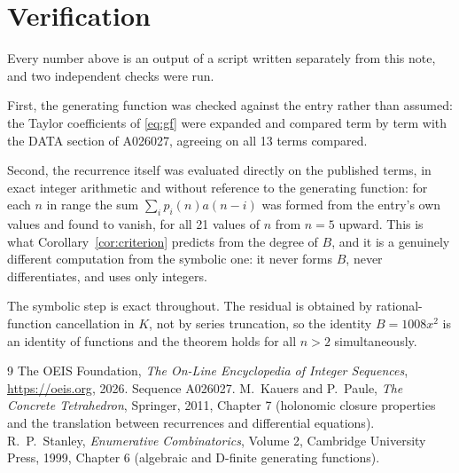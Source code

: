 \documentclass[11pt,a4paper]{article}
\theoremstyle{plain}
\theoremstyle{definition}
\begin{document}
\section{Verification}

Every number above is an output of a script written separately from this note, and two
independent checks were run.

First, the generating function was checked against the entry rather than assumed: the
Taylor coefficients of \eqref{eq:gf} were expanded and compared term by term with the DATA
section of A026027, agreeing on all 13 terms compared.

Second, the recurrence itself was evaluated directly on the published terms, in exact
integer arithmetic and without reference to the generating function: for each $n$ in range
the sum $\sum_{i}p_{i}(n)a(n-i)$ was formed from the entry's own values and found to
vanish, for all 21 values of $n$ from $n=5$ upward. This is what
Corollary~\ref{cor:criterion} predicts from the degree of $B$, and it is a genuinely
different computation from the symbolic one: it never forms $B$, never differentiates, and
uses only integers.

The symbolic step is exact throughout. The residual is obtained by rational-function
cancellation in $K$, not by series truncation, so the identity $B=1008 x^{2}$ is an
identity of functions and the theorem holds for all $n>2$ simultaneously.

\begin{thebibliography}{9}
 The OEIS Foundation, \emph{The On-Line Encyclopedia of Integer Sequences},
\url{https://oeis.org}, 2026. Sequence A026027.
 M.~Kauers and P.~Paule, \emph{The Concrete Tetrahedron}, Springer, 2011,
Chapter 7 (holonomic closure properties and the translation between recurrences and
differential equations).
 R.~P.~Stanley, \emph{Enumerative Combinatorics}, Volume 2, Cambridge
University Press, 1999, Chapter 6 (algebraic and D-finite generating functions).
\end{thebibliography}
\end{document}
